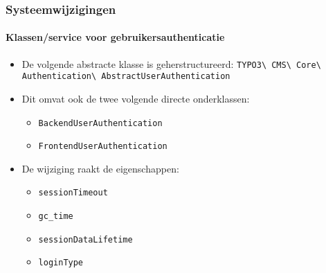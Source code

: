 
\begin{frame}[fragile]
	\frametitle{Systeemwijzigingen}
	\framesubtitle{Klassen/service voor gebruikersauthenticatie}

	\begin{itemize}
		\item De volgende abstracte klasse is geherstructureerd:\newline
			\small\texttt{TYPO3\textbackslash
				CMS\textbackslash
				Core\textbackslash
				Authentication\textbackslash
				AbstractUserAuthentication}\normalsize
		\item Dit omvat ook de twee volgende directe onderklassen:

			\begin{itemize}
				\item \texttt{BackendUserAuthentication}
				\item \texttt{FrontendUserAuthentication}
			\end{itemize}

		\item De wijziging raakt de eigenschappen:

			\begin{itemize}
				\item \texttt{sessionTimeout}
				\item \texttt{gc\_time}
				\item \texttt{sessionDataLifetime}
				\item \texttt{loginType}
			\end{itemize}

	\end{itemize}

\end{frame}


